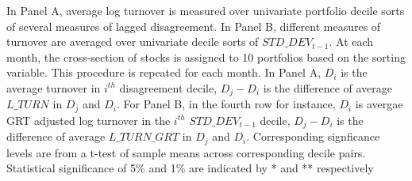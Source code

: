 \begin{landscape}
\begin{table}
\begin{threeparttable}
\begin{tablenotes}
\item In Panel A, average log turnover is measured over univariate portfolio decile sorts of several measures of lagged disagreement. In Panel B, different measures of turnover are averaged over univariate decile sorts of $STD\_DEV_{t-1}$. At each month, the cross-section of stocks is assigned to 10 portfolios based on the sorting variable. This procedure is repeated for each month. In Panel A, $D_i$ is the average turnover in $i^{th}$ disagreement decile, $D_j - D_i$ is the difference of average $L\_TURN$ in $D_j$ and $D_i$. For Panel B, in the fourth row for instance, $D_i$ is avergae GRT adjusted log turnover in the $i^{th}$ $STD\_DEV_{t-1}$ decile, $D_j - D_i$ is the difference of average $L\_TURN\_GRT$ in $D_j$ and $D_i$. Corresponding signficance levels are from a t-test of sample means across corresponding decile pairs. Statistical significance of 5\% and 1\% are indicated by * and ** respectively
\end{tablenotes}
\end{threeparttable}


\end{table}
\end{landscape}
\restoregeometry
